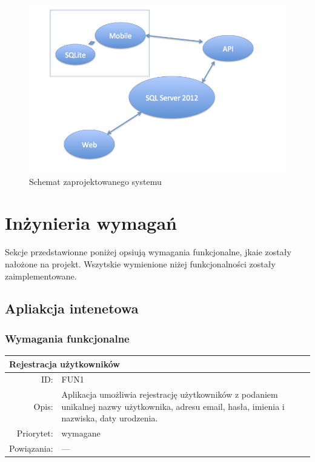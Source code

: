 \begin{figure}[ht]
	\centering
		\includegraphics[width=1\linewidth]{assets/system_schema.png}
	\caption{Schemat zaprojektowanego systemu}
	\label{fig:system_schema}
\end{figure}


\section{Inżynieria wymagań} %
\label{sec:in_ynieria_wymaga_}
Sekcje przedstawionne poniżej opsiują wymagania funkcjonalne, jkaie zostały nałożone na projekt. Wszytskie wymienione niżej funkcjonalności zostały zaimplementowane.

\subsection{Apliakcja intenetowa} %
\label{sub:apliakcja_intenetowa}
\subsubsection{Wymagania funkcjonalne}
\begin{center}
      \begin{tabular}{rp{10cm}}
	      \multicolumn{2}{l}{\textbf{Rejestracja użytkowników}} \\
	      \hline
	      ID: & FUN1 \\
	      Opis: & Aplikacja umożliwia rejestrację użytkowników z podaniem unikalnej nazwy użytkownika, adresu email, hasła, imienia i nazwiska, daty urodzenia. \\
	      Priorytet: & wymagane \\
	      Powiązania: & --- \\
    \end{tabular}
\end{center}

